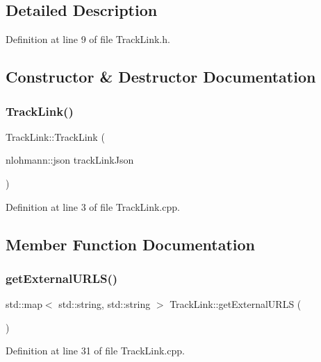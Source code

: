 \subsection{Detailed Description}


Definition at line 9 of file Track\+Link.\+h.



\subsection{Constructor \& Destructor Documentation}
\mbox{\label{class_track_link_a3534cccba532f6940ceca8f9c6eb8d25}} 
\subsubsection{\texorpdfstring{Track\+Link()}{TrackLink()}}
{\footnotesize\ttfamily Track\+Link\+::\+Track\+Link (\begin{DoxyParamCaption}\item[{nlohmann\+::json}]{track\+Link\+Json }\end{DoxyParamCaption})}



Definition at line 3 of file Track\+Link.\+cpp.



\subsection{Member Function Documentation}
\mbox{\label{class_track_link_a6ec0e6dcce0e8d6dcc53b25cac578d49}} 
\subsubsection{\texorpdfstring{get\+External\+U\+R\+L\+S()}{getExternalURLS()}}
{\footnotesize\ttfamily std\+::map$<$ std\+::string, std\+::string $>$ Track\+Link\+::get\+External\+U\+R\+LS (\begin{DoxyParamCaption}{ }\end{DoxyParamCaption})}



Definition at line 31 of file Track\+Link.\+cpp.

